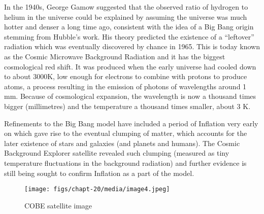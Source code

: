 \documentclass[revision-guide.tex]{subfiles}
\begin{document}
In the 1940s, George Gamow suggested that the observed ratio of hydrogen
to helium in the universe could be explained by assuming the universe
was much hotter and denser a long time ago, consistent with the idea of
a Big Bang origin stemming from Hubble's work. His theory predicted the
existence of a ``leftover'' radiation which was eventually discovered by
chance in 1965. This is today known as the Cosmic Microwave Background
Radiation and it has the biggest cosmological red shift. It was produced
when the early universe had cooled down to about 3000K, low enough for
electrons to combine with protons to produce atoms, a process resulting
in the emission of photons of wavelengths around 1 mm. Because of
cosmological expansion, the wavelength is now a thousand times bigger
(millimetres) and the temperature a thousand times smaller, about 3 K.

Refinements to the Big Bang model have included a period of Inflation
very early on which gave rise to the eventual clumping of matter, which
accounts for the later existence of stars and galaxies (and planets and
humans). The Cosmic Background Explorer satellite revealed such clumping
(measured as tiny temperature fluctuations in the background radiation)
and further evidence is still being sought to confirm Inflation as a
part of the model.

\begin{figure}[h]
\texttt{[image: figs/chapt-20/media/image4.jpeg]}
\caption{COBE satellite image}
\end{figure}
\end{document}
